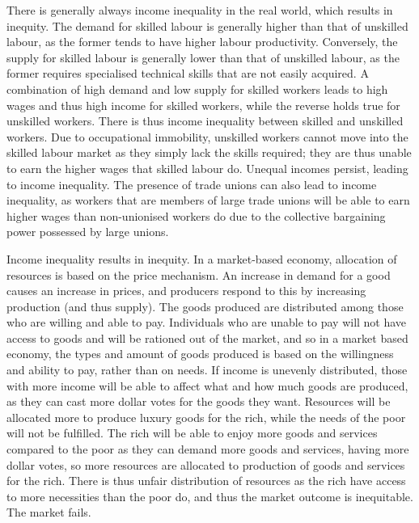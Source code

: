 \documentclass[Economics.tex]{subfiles}
\begin{document}
There is generally always income inequality in the real world, which results in inequity. The demand for skilled labour is generally higher than that of unskilled labour, as the former tends to have higher labour productivity. Conversely, the supply for skilled labour is generally lower than that of unskilled labour, as the former requires specialised technical skills that are not easily acquired. A combination of high demand and low supply for skilled workers leads to high wages and thus high income for skilled workers, while the reverse holds true for unskilled workers. There is thus income inequality between skilled and unskilled workers. Due to occupational immobility, unskilled workers cannot move into the skilled labour market as they simply lack the skills required; they are thus unable to earn the higher wages that skilled labour do. Unequal incomes persist, leading to income inequality. The presence of trade unions can also lead to income inequality, as workers that are members of large trade unions will be able to earn higher wages than non-unionised workers do due to the collective bargaining power possessed by large unions.

Income inequality results in inequity. In a market-based economy, allocation of resources is based on the price mechanism. An increase in demand for a good causes an increase in prices, and producers respond to this by increasing production (and thus supply). The goods produced are distributed among those who are willing and able to pay. Individuals who are unable to pay will not have access to goods and will be rationed out of the market, and so in a market based economy, the types and amount of goods produced is based on the willingness and ability to pay, rather than on needs. If income is unevenly distributed, those with more income will be able to affect what and how much goods are produced, as they can cast more dollar votes for the goods they want. Resources will be allocated more to produce luxury goods for the rich, while the needs of the poor will not be fulfilled. The rich will be able to enjoy more goods and services compared to the poor as they can demand more goods and services, having more dollar votes, so more resources are allocated to production of goods and services for the rich. There is thus unfair distribution of resources as the rich have access to more necessities than the poor do, and thus the market outcome is inequitable. The market fails.
\end{document}
